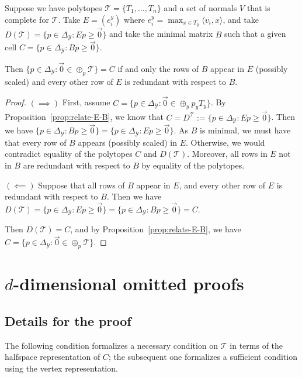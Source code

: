 \documentclass[final]{colt2020} %
\newcommand{\Comments}{1}
\newcommand{\mytodo}[2]{\ifnum\Comments=1%
	\todo[linecolor=#1!80!black,backgroundcolor=#1,bordercolor=#1!80!black]{#2}\fi}
\newcommand{\btw}[1]{\mytodo{orange!20!white}{BTW: #1}}
\newcommand{\simplex}{\Delta_\Y}
\newcommand{\T}{\mathcal{T}}
\newcommand{\Y}{\mathcal{Y}}
\newcommand{\inprod}[2]{\langle #1, #2 \rangle}%
\begin{document}
\begin{proposition}\label{prop:relate-rows}
	Suppose we have polytopes $\T = \{T_1, \ldots, T_n\}$ and a set of normals $V$ that is complete for $\T$.
	Take $E = (e_{i}^y)$ where $e_{i}^y = \max_{x \in T_y} \inprod{v_i}{x}$, and take $D(\T) = \{p \in \simplex : Ep \geq \vec 0\}$ and take the minimal matrix $B$ such that a given cell $C = \{p \in \simplex : Bp \geq \vec 0\}$.
	
	Then $\{p \in \simplex : \vec 0 \in \oplus_p \T\} = C$	if and only the rows of $B$ appear in $E$ (possibly scaled) and every other row of $E$ is redundant with respect to $B$.
\end{proposition}
\begin{proof}
		$(\implies)$ First, assume $C = \{p \in \simplex: \vec 0 \in \oplus_y p_y T_y\}$.
		By Proposition~\ref{prop:relate-E-B}, we know that $C = D^\T := \{p \in \simplex : Ep \geq \vec 0\}$.
		Then we have $\{p \in \simplex : Bp \geq \vec 0\} = \{p \in \simplex : Ep \geq \vec 0\}$.
		As $B$ is minimal, we must have that every row of $B$ appears (possibly scaled) in $E$.
		Otherwise, we would contradict equality of the polytopes $C$ and $D(\T)$.
		Moreover, all rows in $E$ not in $B$ are redundant with respect to $B$ by equality of the polytopes.
		
		$(\impliedby)$ Suppose that all rows of $B$ appear in $E$, and every other row of $E$ is redundant with respect to $B$.
		Then we have $D(\T) = \{p\in \simplex : Ep \geq \vec 0\} = \{p \in \simplex : Bp \geq \vec 0\} = C$.
		
		Then $D(\T) = C$, and by Proposition~\ref{prop:relate-E-B}, we have $C = \{p \in \simplex : \vec 0 \in \oplus_p \T\}$.
\end{proof}


\section{$d$-dimensional omitted proofs}\label{app:omitted-d-dim}

\subsection{Details for the proof}

The following condition formalizes a necessary condition on $\T$ in terms of the halfspace representation of $C$; the subsequent one formalizes a sufficient condition using the vertex representation.
\end{document}
